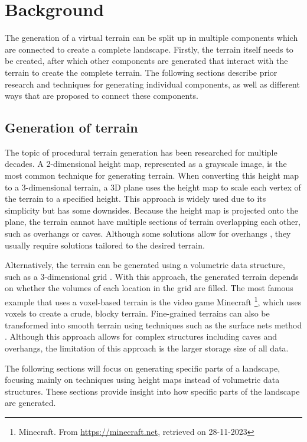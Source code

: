 \section{Background}
The generation of a virtual terrain can be split up in multiple components which are connected to create a complete landscape. Firstly, the terrain itself needs to be created, after which other components are generated that interact with the terrain to create the complete terrain. The following sections describe prior research and techniques for generating individual components, as well as different ways that are proposed to connect these components.

\subsection{Generation of terrain}
The topic of procedural terrain generation has been researched for multiple decades. A 2-dimensional height map, represented as a grayscale image, is the most common technique for generating terrain. When converting this height map to a 3-dimensional terrain, a 3D plane uses the height map to scale each vertex of the terrain to a specified height. This approach is widely used due to its simplicity but has some downsides. Because the height map is projected onto the plane, the terrain cannot have multiple sections of terrain overlapping each other, such as overhangs or caves. Although some solutions allow for overhangs \cite{gamito_procedural_2003}, they usually require solutions tailored to the desired terrain.

Alternatively, the terrain can be generated using a volumetric data structure, such as a 3-dimensional grid \cite{dey_procedural_2018}. With this approach, the generated terrain depends on whether the volumes of each location in the grid are filled. The most famous example that uses a voxel-based terrain is the video game Minecraft \footnote{Minecraft. From \url{https://minecraft.net}, retrieved on 28-11-2023}, which uses voxels to create a crude, blocky terrain. Fine-grained terrains can also be transformed into smooth terrain using techniques such as the surface nets method \cite{gibson_constrained_1998}. Although this approach allows for complex structures including caves \cite{cui_voxel-based_2011} and overhangs, the limitation of this approach is the larger storage size of all data.

The following sections will focus on generating specific parts of a landscape, focusing mainly on techniques using height maps instead of volumetric data structures. These sections provide insight into how specific parts of the landscape are generated.

